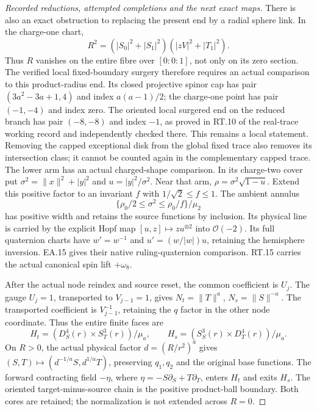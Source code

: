 \begin{proof}[Recorded reductions, attempted completions and the next exact maps]
There is also an exact obstruction to replacing the present
end by a radial sphere link. In the charge-one chart,
\[
 R^2=(|S_0|^2+|S_1|^2)(|zV|^2+|T_1|^2).
\]
Thus \(R\) vanishes on the entire fibre over
\([0:0:1]\), not only on its zero section. The verified
local fixed-boundary surgery therefore requires an actual
comparison to this product-radius end. Its closed
projective spinor cap has pair
\((3a^2-3a+1,4)\) and index \(a(a-1)/2\);
the charge-one point has pair \((-1,-4)\) and index zero.
The oriented local surgered end on the reduced branch
has pair \((-8,-8)\) and index \(-1\), as proved in
RT.10 of the real-trace working record and independently
checked there. This remains a local statement. Removing
the capped exceptional disk from the global fixed trace
also removes its intersection class; it cannot be counted
again in the complementary capped trace. The lower arm has an actual charged-shape comparison. In its
charge-two cover put \(\sigma^2=\|x\|^2+|y|^2\) and
\(u=|y|^2/\sigma^2\). Near that arm,
\(\rho=\sigma^2\sqrt{1-u}\). Extend this positive factor
to an invariant \(f\) with \(1/\sqrt2\le f\le1\).
The ambient annulus
\[
 \{\rho_0/2\le\sigma^2\le\rho_0/f\}/\mu_2
\]
has positive width and retains the source functions by inclusion.
Its physical line is carried by the explicit Hopf map
\([u,z]\mapsto z u^{\otimes2}\) into \(\mathcal O(-2)\).
Its full quaternion charts have \(w'=w^{-1}\) and
\(u'=(w/|w|)u\), retaining the hemisphere inversion.
EA.15 gives their native ruling-quaternion comparison.
RT.15 carries the actual canonical spin lift \(+\omega_8\).

After the actual node reindex and source reset, the common
coefficient is \(U_j\). The gauge \(U_j=1\), transported to
\(V_{j-1}=1\), gives \(N_t=\|T\|^a\), \(N_s=\|S\|^{-a}\).
The transported coefficient is \(V_{j-1}^{-1}\), retaining
the \(q\) factor in the other node coordinate. Thus the entire
finite faces are
\[
 H_t=(D^4_S(r)\times S^3_T(r))/\mu_a,\qquad
 H_s=(S^3_S(r)\times D^4_T(r))/\mu_a.
\]
On \(R>0\), the actual physical factor \(d=(R/r^2)^a\)
gives \((S,T)\mapsto(d^{-1/a}S,d^{1/a}T)\), preserving
\(q_1,q_2\) and the original base functions.
The forward contracting field \(-\eta\), where
\(\eta=-S\partial_S+T\partial_T\), enters \(H_t\) and
exits \(H_s\). The oriented target-minus-source chain is
the positive product-ball boundary. Both cores are retained;
the normalization is not extended across \(R=0\).


\end{proof}
